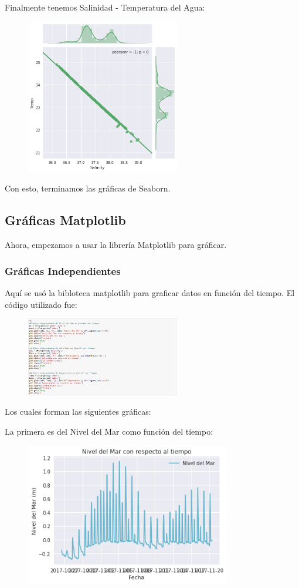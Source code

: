 \documentclass[a4paper]{article}
\begin{document}
\pagebreak
Finalmente tenemos Salinidad - Temperatura del Agua:
\begin{figure}[ht!]
 \centering
  \includegraphics[width=0.6\textwidth]{Pearson3.png}
\end{figure}

Con esto, terminamos las gráficas de Seaborn.

\pagebreak
\subsection{Gráficas Matplotlib}
Ahora, empezamos a usar la librería Matplotlib para gráficar.
\subsubsection{Gráficas Independientes}
Aquí se usó la bibloteca matplotlib para graficar datos en función del tiempo. El código utilizado fue:
\begin{figure}[ht!]
 \centering
  \includegraphics[width=0.6\textwidth]{IndeCodigo.PNG}
\end{figure}
Los cuales forman las siguientes gráficas: 

La primera es del Nivel del Mar como función del tiempo: 
\begin{figure}[ht!]
 \centering
  \includegraphics[width=0.8\textwidth]{Matplotlib1.png}
\end{figure}
\end{document}
